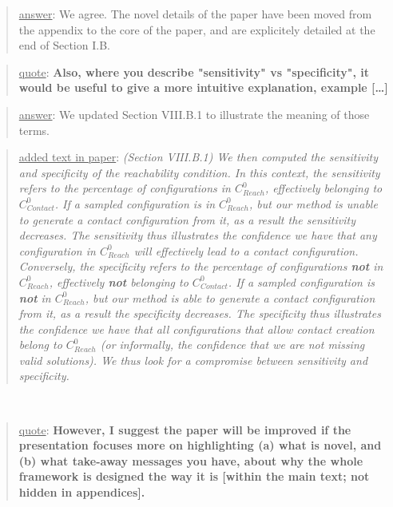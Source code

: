 \documentclass[a4paper]{article}
\newcommand{\gls}[1]{\textit{#1}}
\newcommand{\done}[0]{}
\newcommand\quot[1]{\begin{quote} \underline{quote}: \textbf{#1}\end{quote}}
\newcommand\as[1]{\begin{quote} \underline{answer}: {#1}\end{quote} }
\newcommand\qt[1]{\begin{quote} \underline{added text in paper}: \textit{#1}\end{quote} \leavevmode \\ }
\begin{document}
\as{We agree. The novel details of the paper have been moved from the appendix to the core of the paper, and are explicitely detailed at the end of Section I.B.} \done

\quot{
Also, where you describe "sensitivity" vs "specificity", it would be
useful to give a more intuitive explanation, example [\dots]}

\as{We updated Section VIII.B.1 to illustrate the meaning of those terms.}
\qt{(Section VIII.B.1) We then computed the sensitivity and specificity of the reachability condition.  In this context, the sensitivity refers to the percentage of configurations in $C_{Reach}^0$, effectively belonging to \gls{$C_{Contact}^0$}. If a sampled configuration is in $C_{Reach}^0$, but our method is unable to generate a contact configuration from it, as a result the sensitivity
decreases. The sensitivity thus illustrates the confidence we have that any configuration in $C_{Reach}^0$ will effectively lead to a contact configuration.
Conversely, the specificity refers to the percentage of configurations \textbf{not} in $C_{Reach}^0$, effectively \textbf{not} belonging to \gls{$C_{Contact}^0$}.
If a sampled configuration is \textbf{not} in $C_{Reach}^0$, but our method is able to generate a contact configuration from it, as a result the specificity
decreases. The specificity thus illustrates the confidence we have that all configurations that allow contact creation belong to $C_{Reach}^0$ (or informally, the confidence that we are not missing valid solutions).
We thus look for a compromise between sensitivity and specificity.} \done

\quot{
However, I suggest the paper will be improved if
the presentation focuses more on highlighting (a) what is novel, and
(b)
what take-away messages you have, about why the whole framework is
designed the way it is [within the main text; not hidden in
appendices].}
\end{document}
